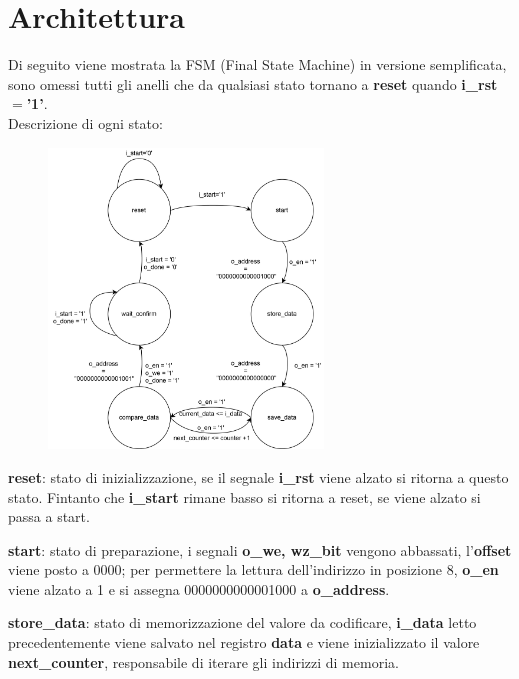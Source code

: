 \documentclass[12pt]{article}
\begin{document}
\section{Architettura}
Di seguito viene mostrata la FSM (Final State Machine) in versione semplificata, sono omessi tutti gli anelli che da qualsiasi stato tornano a \textbf{reset} quando \textbf{i\_rst\(=\)'1'}.\newline
\\Descrizione di ogni stato:
\begin{itemize}
    \parbox[t]{\dimexpr\textwidth-\leftmargin}{%
    \vspace{-2.5mm}
    \begin{figure}
        \centering
        \vspace{-\baselineskip}
        \includegraphics[width=0.65\textwidth]{FSM.png}
    \end{figure}
    \item \textbf{reset}: stato di inizializzazione, se il segnale \textbf{i\_rst} viene alzato si ritorna a questo stato. Fintanto che \textbf{i\_start} rimane basso si ritorna a reset, se viene alzato si passa a start.
    \item \textbf{start}: stato di preparazione, i segnali \textbf{o\_we, wz\_bit} vengono abbassati, l'\textbf{offset} viene posto a 0000; per permettere la lettura dell'indirizzo in posizione 8, \textbf{o\_en} viene alzato a 1 e si assegna 0000000000001000 a \textbf{o\_address}.
    \item \textbf{store\_data}: stato di memorizzazione del valore da codificare, \textbf{i\_data} letto precedentemente viene salvato nel registro \textbf{data} e viene inizializzato il valore \textbf{next\_counter}, responsabile di iterare gli indirizzi di memoria.
}
\end{itemize}
\end{document}
